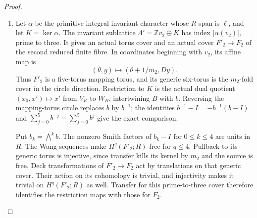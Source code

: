 \begin{proof}
\begin{enumerate}[label=\arabic*.]
The base-orbifold quotient in \cref{maps:src:F.2.7} shows that
$\gcd(m_1,m_2)=1$.  In particular $m_1$ is a unit in $R$.
The homology augmentation matrix $[A^t-I\mid B^t-I]$ has first
row zero and rank-five minors $-4$ and $-1$ in its last five
rows, respectively.  Its coinvariant quotient over $R$ is
therefore $R$ through $\ell(x)=x_0$.  With $a_i=\ell(v_i)$,
the finite power relations and cusp clutch give the quotient
relation matrix
\[
 \begin{pmatrix}m_1&0&-a_1\\0&m_2&-a_2\\1&1&-\delta\end{pmatrix}.
\]
Here $\delta$ is the character value of the actual cusp clutch.
The character annihilates the collapsed angular cycles, so these
maps on the finite caps and cusp agree on the boundary and define
a quotient of the abelianized fundamental group.  Simple
connectivity makes its determinant a unit.  Reduction modulo
three forces $a_2$ to be a unit.  Arbitrary clutch translations
are included in $\delta$.

\item Let $\alpha$ be the primitive integral invariant character
whose $R$-span is $\ell$, and let $K=\ker\alpha$.  The invariant
sublattice $\Lambda'=\mathbb Zv_2\oplus K$ has index
$|\alpha(v_2)|$, prime to three.  It gives an actual torus cover
and an actual cover $F'_2\to F_2$ of the second reduced finite
fibre.  In coordinates beginning with $v_2$, its affine map is
\[
 (\theta,y)\longmapsto(\theta+1/m_2,Dy).
\]
Thus $F'_2$ is a five-torus mapping torus, and its generic
six-torus is the $m_2$-fold cover in the circle direction.
Restriction to $K$ is the actual dual quotient
$(x_0,x')\mapsto x'$ from $V_R$ to $W_R$, intertwining $B$ with $b$.
Reversing the mapping-torus circle replaces $b$ by $b^{-1}$;
the identities $b^{-1}-I=-b^{-1}(b-I)$ and
$\sum_{j=0}^5b^{-j}=\sum_{j=0}^5b^j$ give the exact comparison.

Put $b_k=\bigwedge^kb$.  The nonzero Smith factors of $b_k-I$
for $0\leq k\leq4$ are units in $R$.  The Wang sequences make
$H^q(F'_2;R)$ free for $q\leq4$.  Pullback to its generic torus
is injective, since transfer kills its kernel by $m_2$ and the
source is free.  Deck transformations of $F'_2\to F_2$ act by
translations on that generic cover.  Their action on its
cohomology is trivial, and injectivity makes it trivial on
$H^q(F'_2;R)$ as well.  Transfer for this prime-to-three cover
therefore identifies the restriction maps with those for $F_2$.


\end{enumerate}
\end{proof}
